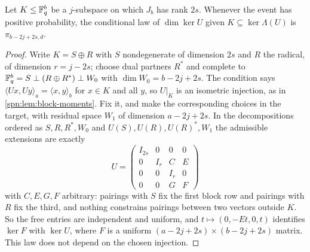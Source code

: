 \begin{lemma}\label{spn:lem:conditional}
Let $K\le\mathbb{F}_q^b$ be a $j$-subspace on which $J_b$ has rank $2s$. Whenever the event has positive
probability, the conditional law of $\dim\ker U$ given $K\subseteq\ker\Lambda(U)$ is
$\pi_{b-2j+2s,d}$.
\end{lemma}

\begin{proof}
Write $K=S\oplus R$ with $S$ nondegenerate of dimension $2s$ and $R$ the radical, of dimension
$r=j-2s$; choose dual partners $R^*$ and complete to
$\mathbb{F}_q^b=S\perp(R\oplus R^*)\perp W_0$ with $\dim W_0=b-2j+2s$. The condition says
$\langle Ux,Uy\rangle_a=\langle x,y\rangle_b$ for $x\in K$ and all $y$, so $U|_K$ is an isometric
injection, as in \cref{spn:lem:block-moments}. Fix it, and make the corresponding choices in the
target, with residual space $W_1$ of dimension $a-2j+2s$. In the decompositions ordered as
$S,R,R^*,W_0$ and $U(S),U(R),U(R)^*,W_1$ the admissible extensions are exactly
\[
 U=\begin{pmatrix}I_{2s}&0&0&0\\0&I_r&C&E\\0&0&I_r&0\\0&0&G&F\end{pmatrix}
\]
with $C,E,G,F$ arbitrary: pairings with $S$ fix the first block row and pairings with $R$ fix the
third, and nothing constrains pairings between two vectors outside $K$. So the free entries are
independent and uniform, and $t\mapsto(0,-Et,0,t)$ identifies $\ker F$ with $\ker U$, where $F$ is a
uniform $(a-2j+2s)\times(b-2j+2s)$ matrix. This law does not depend on the chosen injection.
\end{proof}

